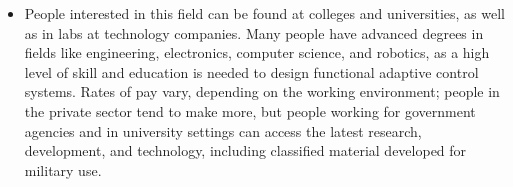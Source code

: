 \documentclass[12pt]{article}
\begin{document}
\begin{itemize}
 

\item People interested in this field can be found at colleges and universities, as well as in labs at technology companies. Many people have advanced degrees in fields like engineering, electronics, computer science, and robotics, as a high level of skill and education is needed to design functional adaptive control systems. Rates of pay vary, depending on the working environment; people in the private sector tend to make more, but people working for government agencies and in university settings can access the latest research, development, and technology, including classified material developed for military use.
\end{itemize}
 
\end{document}
